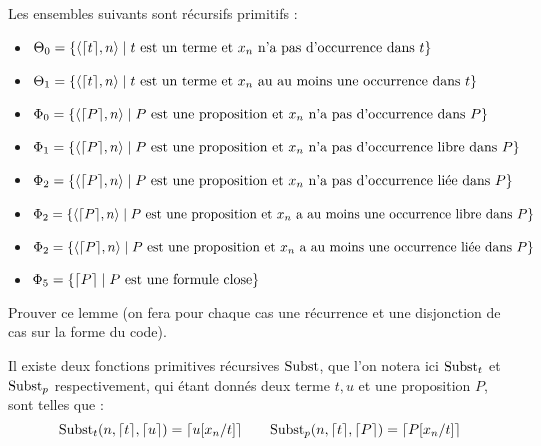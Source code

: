 \begin{lem}
    Les ensembles suivants sont récursifs primitifs :
    \begin{itemize}[label=$\bullet$]
        \item $\Theta_0 = \{ \langle\lceil t \rceil,n\rangle\mid t\text{ est un terme et } x_n\text{ n'a pas d'occurrence dans }t\}$
        \item $\Theta_1 = \{ \langle\lceil t \rceil,n\rangle\mid t\text{ est un terme et } x_n\text{ au au moins une occurrence dans }t\}$
        \item $\Phi_0 = \{ \langle \lceil P \rceil,n\rangle \mid P \text{ est une proposition et } x_n \text{ n'a pas d'occurrence dans }P\}$
        \item $\Phi_1 = \{ \langle \lceil P \rceil,n\rangle \mid P \text{ est une proposition et } x_n \text{ n'a pas d'occurrence libre dans }P\}$
        \item $\Phi_2 = \{ \langle \lceil P \rceil,n\rangle \mid P \text{ est une proposition et } x_n \text{ n'a pas d'occurrence liée dans }P\}$ 
        \item $\Phi_2 = \{ \langle \lceil P \rceil,n\rangle \mid P \text{ est une proposition et } x_n \text{ a au moins une occurrence libre dans }P\}$ 
        \item $\Phi_2 = \{ \langle \lceil P \rceil,n\rangle \mid P \text{ est une proposition et } x_n \text{ a au moins une occurrence liée dans }P\}$ 
        \item $\Phi_5 = \{ \lceil P \rceil \mid P\text{ est une formule close}\}$
    \end{itemize}
\end{lem}

\begin{exo}
    Prouver ce lemme (on fera pour chaque cas une récurrence et une disjonction de cas sur la forme du code).
\end{exo}

\begin{lem}[Substitution]
    Il existe deux fonctions primitives récursives $\mathrm{Subst}$, que l'on notera ici $\mathrm{Subst}_t$ et $\mathrm{Subst}_p$ respectivement, qui étant donnés deux terme $t,u$ et une proposition $P$, sont telles que : $$\mathrm{Subst}_t (n,\lceil t \rceil,\lceil u \rceil) = \lceil u[x_n/t] \rceil\qquad \mathrm{Subst}_p(n,\lceil t \rceil,\lceil P \rceil) = \lceil P[x_n/t] \rceil$$
\end{lem}

